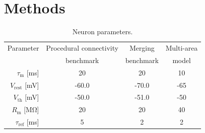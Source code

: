 \documentclass[9pt,a4paper]{amsart}
\begin{document}
\section{Methods}
\begin{table}
  \centering
  \begin{tabular}{r S S S}
    \toprule
        {Parameter}                             & {Procedural connectivity} & {Merging}         & {Multi-area} \\
                                                & {benchmark}               & {benchmark}       & {model} \\
    \midrule
        $\tau_{\text{m}}$ [\si{\milli\second}]         & 20                        & 20                & 10 \\
        $V_{\text{rest}}$ [\si{\milli\volt}]           & -60.0                     & -70.0             & -65 \\
       
        $V_{\text{th}}$ [\si{\milli\volt}]         & -50.0                     & -51.0             & -50 \\
        $R_{\text{m}}$ [\si{\mega\ohm}]                  & 20                        & 20                & 40 \\
        $\tau_{\text{ref}}$ [\si{\milli\second}]       & 5                         & 2                 & 2 \\
    \bottomrule
  \end{tabular}
  \caption{Neuron parameters.}
  \label{tab:parameters}
\end{table}
\end{document}
